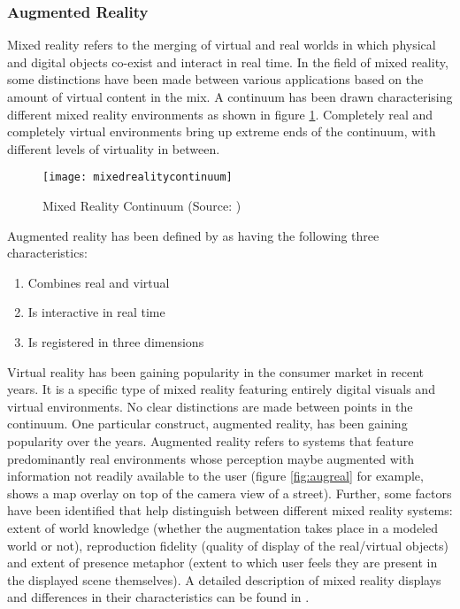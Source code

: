 \subsubsection{Augmented Reality}
\label{sec:augreal}
Mixed reality refers to the merging of virtual and real worlds in which physical and digital objects co-exist and interact in real time. In the field of mixed reality, some distinctions have been made between various applications based on the amount of virtual content in the mix. A continuum has been drawn characterising different mixed reality environments as shown in figure \ref{fig:mixedrealitycontinuum}. Completely real and completely virtual environments bring up extreme ends of the continuum, with different levels of virtuality in between. 

\begin{figure}
	\centering
	\texttt{[image: mixedrealitycontinuum]}
	\caption{Mixed Reality Continuum (Source: \cite{milgram1995augmented})}
	\label{fig:mixedrealitycontinuum}
\end{figure}

Augmented reality has been defined by \textcite{azuma1997survey} as having the following three characteristics: 

\begin{enumerate}
\item Combines real and virtual 
\item Is interactive in real time
\item Is registered in three dimensions
\end{enumerate} 

Virtual reality has been gaining popularity in the consumer market in recent years. It is a specific type of mixed reality featuring entirely digital visuals and virtual environments. No clear distinctions are made between points in the continuum. One particular construct, augmented reality, has been gaining popularity over the years. Augmented reality refers to systems that feature predominantly real environments whose perception maybe augmented with information not readily available to the user (figure \ref{fig:augreal} for example, shows a map overlay on top of the camera view of a street). Further, some factors have been identified that help distinguish between different mixed reality systems: extent of world knowledge (whether the augmentation takes place in a modeled world or not), reproduction fidelity (quality of display of the real/virtual objects) and extent of presence metaphor (extent to which user feels they are present in the displayed scene themselves). A detailed description of mixed reality displays and differences in their characteristics can be found in \cite{milgram1995augmented}. 

